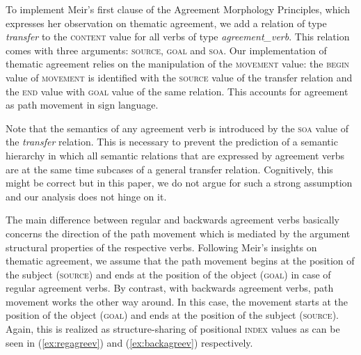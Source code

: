 \documentclass[11pt,a4paper,fleqn]{article}
\begin{document}
To implement Meir’s first clause of the Agreement Morphology Principles, which expresses her observation on thematic agreement, we add a relation of type \textit{transfer} to the \textsc{content} value for all verbs of type \textit{agreement\_verb}. This relation comes with three arguments: \textsc{source}, \textsc{goal} and \textsc{soa}. Our implementation of thematic agreement relies on the manipulation of the \textsc{movement} value: the \textsc{begin} value of \textsc{movement} is identified with the \textsc{source} value of the transfer relation and the \textsc{end} value with \textsc{goal} value of the same relation. This accounts for agreement as path movement in sign language.

\begin{exe}
\ex  \label{ex:agreev}
\end{exe}

Note that the semantics of any agreement verb is introduced by the \textsc{soa} value of the \textit{transfer} relation. This is necessary to prevent the prediction of a semantic hierarchy in which all semantic relations that are expressed by agreement verbs are at the same time subcases of a general transfer relation. Cognitively, this might be correct but in this paper, we do not argue for such a strong assumption and our analysis does not hinge on it.

The main difference between regular and backwards agreement verbs basically concerns the direction of the path movement which is mediated by the argument structural properties of the respective verbs. Following Meir’s insights on thematic agreement,  we assume that the path movement begins at the position of the subject (\textsc{source}) and ends at the position of the object (\textsc{goal}) in case of regular agreement verbs. By contrast, with backwards agreement verbs, path movement works the other way around. In this case, the movement starts at the position of the object (\textsc{goal}) and ends at the position of the subject (\textsc{source}). Again, this is realized as structure-sharing of positional \textsc{index} values as can be seen in (\ref{ex:regagreev}) and (\ref{ex:backagreev}) respectively.
\end{document}
